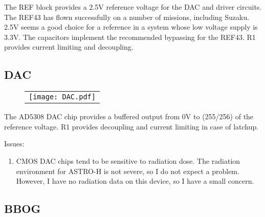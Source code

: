\documentclass[a4paper,12pt]{article}
\begin{document}
The REF block provides a 2.5V reference voltage for the DAC and driver circuits. The REF43 has flown successfully on a number of missions, including Suzaku. 2.5V seems a good choice for a reference in a system whose low voltage supply is 3.3V. The capacitors implement the recommended bypassing for the REF43.
R1 provides current limiting and decoupling.


\subsection{DAC}
   \begin{figure}
   \begin{center}
   \begin{tabular}{c}
   \texttt{[image: DAC.pdf]}
   \end{tabular}
   \end{center}
   \end{figure}
The AD5308 DAC chip provides a buffered output from 0V to (255/256) of the reference voltage. R1 provides decoupling and current limiting in case of latchup.

Issues:
\begin{enumerate}
\item
CMOS DAC chips tend to be sensitive to radiation dose. The radiation environment for ASTRO-H is not severe, so I do not expect a problem. However, I have no radiation data on this device, so I have a small concern.
\end{enumerate}

\subsection{BBOG}
\end{document}
